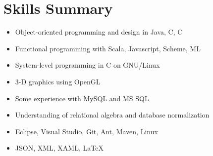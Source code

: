 \documentclass[12pt,letterpaper,sans]{moderncv}
\newcommand{\cpp}
    {C\nolinebreak\hspace{-0.05em}\raisebox{0.4ex}{\textbf{\scriptsize+}}\nolinebreak\hspace{-0.10em}\raisebox{0.4ex}{\textbf{\scriptsize+}}}
\newcommand{\csharp}
    {C\nolinebreak\hspace{-.05em}\raisebox{0.4ex}{\small\#}}
\begin{document}
\section{Skills Summary}
    {\begin{itemize}
        \item Object-oriented programming and design in Java, \csharp, \cpp
        \item Functional programming with Scala, Javascript, Scheme, ML
        \item System-level programming in C on GNU/Linux
        \item 3-D graphics using OpenGL
    \end{itemize}}\vspace*{-\baselineskip}
    {\begin{itemize}
        \item Some experience with MySQL and MS SQL 
        \item Understanding of relational algebra and database normalization
    \end{itemize}}\vspace*{-\baselineskip}
    {\begin{itemize}
        \item Eclipse, Visual Studio, Git, Ant, Maven, Linux
        \item JSON, XML, XAML, LaTeX
    \end{itemize}}\vspace*{-\baselineskip}
\end{document}
